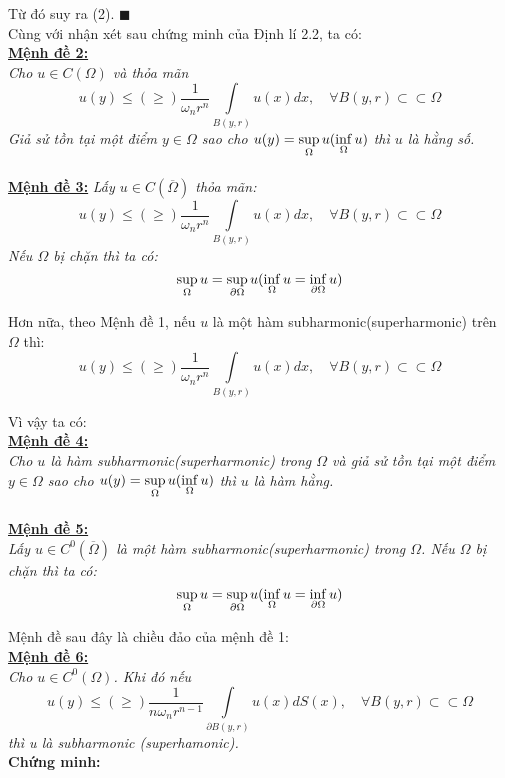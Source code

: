 Từ đó suy ra (2). $\blacksquare$
\\

Cùng với nhận xét sau chứng minh của Định lí 2.2, ta có:
\\
{ \underline{\bf Mệnh đề 2:}}
\\
{\it Cho $u\in C(\Omega)$ và thỏa mãn
\[u(y) \le ( \ge )\frac{1}{{\omega _n r^n }}\int\limits_{B(y,r)} {u(x)dx},\quad \forall B(y,r) \subset\subset \Omega\]
Giả sử tồn tại một điểm $y\in \Omega$ sao cho $
u(y) = \mathop {\sup }\limits_\Omega  u(\mathop {{\rm{inf}}}\limits_\Omega  u)$ thì $u$ là hằng số.}
\\
\\
{\underline {\bf Mệnh đề 3:}} {\it Lấy $u \in C (\overline\Omega ) $ thỏa mãn:
\[u(y) \le ( \ge )\frac{1}{{\omega _n r^n }}\int\limits_{B(y,r)} {u(x)dx},\quad \forall B(y,r) \subset\subset \Omega\]
Nếu $\Omega$ bị chặn thì ta có:
\[
\mathop {\sup }\limits_\Omega  u = \mathop {\sup }\limits_{\partial \Omega } u(\mathop {{\rm{inf}}}\limits_\Omega  u = \mathop {{\rm{inf}}}\limits_{\partial \Omega } u)
\]}

Hơn nữa, theo Mệnh đề 1, nếu $u$ là một hàm subharmonic(superharmonic) trên $\Omega$ thì:
\[
u(y) \le ( \ge )\frac{1}{{\omega _n r^n }}\int\limits_{B(y,r)} {u(x)dx},\quad \forall B(y,r) \subset\subset \Omega
\]

Vì vậy ta có:
\\
{ \underline{\bf Mệnh đề 4:}} 
\\
{\it Cho $u$ là hàm subharmonic(superharmonic) trong $\Omega$ và giả sử tồn tại một điểm $y\in \Omega$ sao cho $
u(y) = \mathop {\sup }\limits_\Omega  u(\mathop {{\rm{inf}}}\limits_\Omega  u)$ thì $u$ là hàm hằng.}
 \\
 \\
{ \underline{\bf Mệnh đề 5:}} 
\\
{\it Lấy $u \in C^0 (\overline \Omega  )$ là một hàm subharmonic(superharmonic) trong $\Omega$. Nếu $\Omega$ bị chặn thì ta có:
\[
\mathop {\sup }\limits_\Omega  u = \mathop {\sup }\limits_{\partial \Omega } u(\mathop {{\rm{inf}}}\limits_\Omega  u = \mathop {{\rm{inf}}}\limits_{\partial \Omega } u)
\]}

Mệnh đề sau đây là chiều đảo của mệnh đề 1:
\\
{\bf\underline {Mệnh đề 6:}}
\\
 {\it Cho $u \in C^0(\Omega)$.  Khi đó nếu 	
$$
u(y) \le ( \ge )\frac{1}{{n\omega _n r^{n - 1} }}\int\limits_{\partial B(y,r)} {u(x)dS(x)},\quad\forall B(y,r) \subset  \subset \Omega 
$$
thì u là subharmonic (superhamonic).}
\\
{\bf Chứng minh:}

